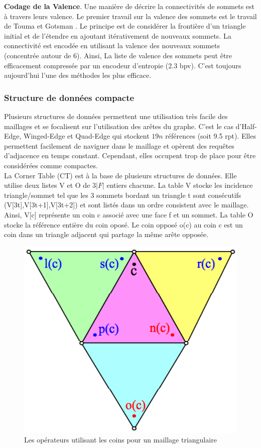 \documentclass[a4paper,11pt,openany]{article}
\begin{document}
\noindent
\textbf{Codage de la Valence}. Une manière de décrire la connectivités de sommets est à travers leurs valence. Le premier travail sur la valence des sommets est le travail de Touma et Gotsman \cite{valence_encoding}. Le principe est de considérer la frontière d'un triangle initial et de l'étendre en ajoutant itérativement de nouveaux sommets. La connectivité est encodée en utilisant la valence des nouveaux sommets (concentrée autour de 6). Ainsi, La liste de valence des sommets peut être efficacement compressée par un encodeur d'entropie (2.3 bpv). C'est toujours aujourd'hui l'une des méthodes les plus efficace.
\subsubsection{Structure de données compacte}
\noindent
Plusieurs structures de données permettent une utilisation très facile des maillages et se focalisent sur l'utilisation des arêtes du graphe. C'est le cas d'Half-Edge, Winged-Edge et Quad-Edge qui stockent $19n$ références (soit 9.5 rpt). Elles permettent facilement de naviguer dans le maillage et opèrent des requêtes d'adjacence en temps constant. Cependant, elles occupent trop de place pour être considérées comme compactes.\\
La Corner Table (CT) est à la base de plusieurs structures de données. Elle utilise deux listes V et O de $3|F|$ entiers chacune. La table V stocke les incidence triangle/sommet tel que les 3 sommets bordant un triangle t sont consécutifs (V[3t],V[3t+1],V[3t+2]) et sont listés dans un ordre consistent avec le maillage. Ainsi, V[c] représente un coin c associé avec une face f et un sommet. La table O stocke la référence entière du coin oposé. Le coin opposé o(c) au coin c est un coin dans un triangle adjacent qui partage la même arête opposée.
\begin{figure}[H]
\begin{center}
\includegraphics[scale=0.2]{Images/corner_table}
\caption{Les opérateurs utilisant les coins pour un maillage triangulaire}
\label{fig:corner_table}
\end{center}
\end{figure}
\end{document}
